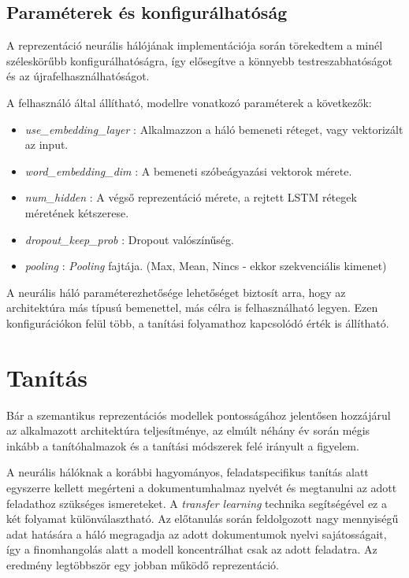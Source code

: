\subsection{Paraméterek és konfigurálhatóság}

A reprezentáció neurális hálójának implementációja során törekedtem a minél széleskörűbb konfigurálhatóságra, így elősegítve a könnyebb testreszabhatóságot és az újrafelhasználhatóságot. 

A felhasználó által állítható, modellre vonatkozó paraméterek a következők:
\begin{itemize}
	\item \textit{use\_embedding\_layer} : Alkalmazzon a háló bemeneti réteget, vagy vektorizált az input.
	\item \textit{word\_embedding\_dim} : A bemeneti szóbeágyazási vektorok mérete.
	\item \textit{num\_hidden} : A végső reprezentáció mérete, a rejtett LSTM rétegek méretének kétszerese.
	\item \textit{dropout\_keep\_prob} : Dropout valószínűség.
	\item \textit{pooling} : \textit{Pooling} fajtája. (Max, Mean, Nincs - ekkor szekvenciális kimenet)	
\end{itemize}

A neurális háló paraméterezhetősége lehetőséget biztosít arra, hogy az architektúra más típusú bemenettel, más célra is felhasználható legyen. Ezen konfigurációkon felül több, a tanítási folyamathoz kapcsolódó érték is állítható.

\section{Tanítás}

Bár a szemantikus reprezentációs modellek pontosságához jelentősen hozzájárul az alkalmazott architektúra teljesítménye, az elmúlt néhány év során mégis inkább a tanítóhalmazok és a tanítási módszerek felé irányult a figyelem.

A neurális hálóknak a korábbi hagyományos, feladatspecifikus tanítás alatt egyszerre kellett megérteni a dokumentumhalmaz nyelvét és megtanulni az adott feladathoz szükséges ismereteket. A \textit{transfer learning} technika segítségével ez a két folyamat különválasztható. Az előtanulás során feldolgozott nagy mennyiségű adat hatására a háló megragadja az adott dokumentumok nyelvi sajátosságait, így a finomhangolás alatt a modell koncentrálhat csak az adott feladatra. Az eredmény legtöbbször egy jobban működő reprezentáció.

